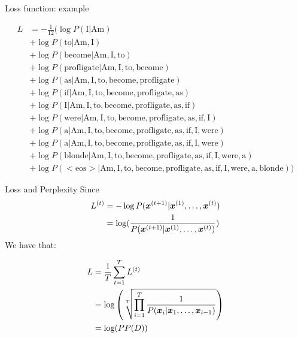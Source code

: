 \documentclass[10pt]{beamer}
\begin{document}
\begin{frame}{Loss function: example}

\begin{align*}
        L &=-\frac{1}{12}(\log P(\text{I} | \text{Am})\\
          &+ \log P(\text{to}| \text{Am}, \text{I})\\
          &+ \log P(\text{become}| \text{Am}, \text{I}, \text{to})\\
		  &+ \log P(\text{profligate}| \text{Am}, \text{I}, \text{to}, \text{become})\\
          &+ \log P(\text{as}| \text{Am}, \text{I}, \text{to}, \text{become}, \text{profligate})\\
          &+ \log P(\text{if}| \text{Am}, \text{I}, \text{to}, \text{become}, \text{profligate}, \text{as})\\
          &+ \log P(\text{I}| \text{Am}, \text{I}, \text{to}, \text{become}, \text{profligate}, \text{as}, \text{if})\\
          &+ \log P(\text{were}| \text{Am}, \text{I}, \text{to}, \text{become}, \text{profligate}, \text{as}, \text{if}, \text{I})\\
          &+ \log P(\text{a}| \text{Am}, \text{I}, \text{to}, \text{become}, \text{profligate}, \text{as}, \text{if}, \text{I}, \text{were})\\
          &+ \log P(\text{a}| \text{Am}, \text{I}, \text{to}, \text{become}, \text{profligate}, \text{as}, \text{if}, \text{I}, \text{were})\\
          &+ \log P(\text{blonde}| \text{Am}, \text{I}, \text{to}, \text{become}, \text{profligate}, \text{as}, \text{if}, \text{I}, \text{were}, \text{a})\\
          &+ \log P(<\text{eos}>| \text{Am}, \text{I}, \text{to}, \text{become}, \text{profligate}, \text{as}, \text{if}, \text{I}, \text{were}, \text{a}, \text{blonde}))
\end{align*}

\end{frame}

\begin{frame}{Loss and Perplexity}
Since
\begin{align*}
L^{(t)} & = - \log P(\bm{x}^{(t+1)} |\bm{x}^{(1)}, \dots, \bm{x}^{(t)})\\
& =  \log(\frac{1}{P(\bm{x}^{(t+1)}|\bm{x}^{(1)}, \dots, \bm{x}^{(t)})})\\
\end{align*}
We have that:

\begin{align*}
        L &=\frac{1}{T} \sum_{t=1}^{T} L^{(t)}\\
          &= \log\left( \sqrt[T]{\prod_{i=1}^{T}\frac{1}{P(\bm{x}_i \vert \bm{x}_1,\dots, \bm{x}_{i-1})}} \right)\\
          &= \log(PP(D))
\end{align*}
\end{frame}
\end{document}
